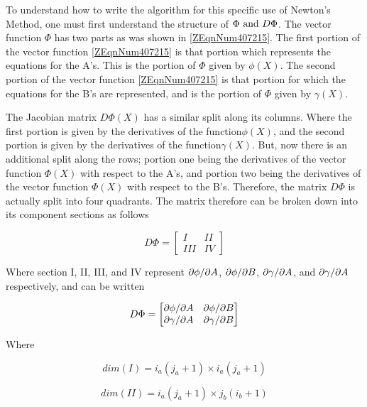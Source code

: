 To understand how to write the algorithm for this specific use of Newton's
Method, one must first understand the structure of $\Phi \text{ and } D\Phi $. The
vector function $\Phi $ has two parts as was shown in \eqref{ZEqnNum407215}. The
first portion of the vector function \eqref{ZEqnNum407215} is that portion which
represents the equations for the A's. This is the portion of $\Phi $ given by
$\phi (X)$. The second portion of the vector function \eqref{ZEqnNum407215} is
that portion for which the equations for the B's are represented, and is the
portion of $\Phi $ given by $\gamma (X)$.

The Jacobian matrix $D\Phi \left(X\right)$ has a similar split along its
columns. Where the first portion is given by the derivatives of the
function$\phi \left(X\right)$, and the second portion is given by the
derivatives of the function$\gamma \left(X\right)$. But, now there is an
additional split along the rows; portion one being the derivatives of the
vector function $\Phi \left(X\right)$ with respect to the A's, and portion two
being the derivatives of the vector function $\Phi \left(X\right)$ with respect
to the B's. Therefore, the matrix $D\Phi $ is actually split into four
quadrants. The matrix therefore can be broken down into its component sections
as follows

\begin{equation*}
    D \Phi = \begin{bmatrix} 
    I & II \\ 
    III & IV \end{bmatrix}
\end{equation*} 

Where section I, II, III, and IV represent $\partial \phi / \partial A$, $\partial \phi / \partial B$,
$\partial \gamma / \partial A$, and $\partial \gamma / \partial A$ respectively, and can be written

\begin{equation} \label{4.8)} 
    D \Phi = \begin{bmatrix}
    \partial \phi / \partial A & \partial \phi / \partial B \\ 
    \partial \gamma / \partial A & \partial \gamma / \partial B \end{bmatrix}
\end{equation}

Where

\begin{equation*}
    dim\left(I\right)=i_{a} \left(j_{a} +1\right)\times i_{a}\left(j_{a} +1\right)
\end{equation*} 

\begin{equation*}
    dim\left(II\right)=i_{a} \left(j_{a} +1\right)\times j_{b} \left(i_{b} +1\right) 
\end{equation*} 

